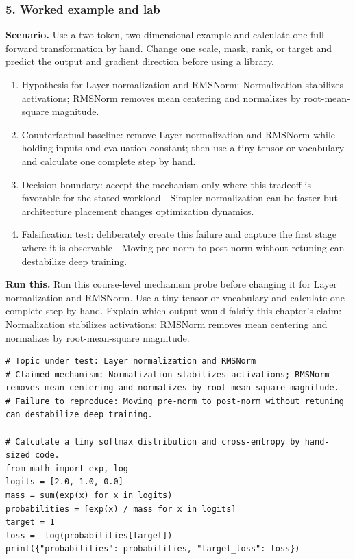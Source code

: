 \subsubsection*{5. Worked example and lab}
\textbf{Scenario.} Use a two-token, two-dimensional example and calculate one full forward transformation by hand. Change one scale, mask, rank, or target and predict the output and gradient direction before using a library.
\begin{enumerate}
\item Hypothesis for Layer normalization and RMSNorm: Normalization stabilizes activations; RMSNorm removes mean centering and normalizes by root-mean-square magnitude.
\item Counterfactual baseline: remove Layer normalization and RMSNorm while holding inputs and evaluation constant; then use a tiny tensor or vocabulary and calculate one complete step by hand.
\item Decision boundary: accept the mechanism only where this tradeoff is favorable for the stated workload—Simpler normalization can be faster but architecture placement changes optimization dynamics.
\item Falsification test: deliberately create this failure and capture the first stage where it is observable—Moving pre-norm to post-norm without retuning can destabilize deep training.
\end{enumerate}
\textbf{Run this.} Run this course-level mechanism probe before changing it for Layer normalization and RMSNorm. Use a tiny tensor or vocabulary and calculate one complete step by hand. Explain which output would falsify this chapter's claim: Normalization stabilizes activations; RMSNorm removes mean centering and normalizes by root-mean-square magnitude.
\begin{Verbatim}[fontsize=\scriptsize]
# Topic under test: Layer normalization and RMSNorm
# Claimed mechanism: Normalization stabilizes activations; RMSNorm removes mean centering and normalizes by root-mean-square magnitude.
# Failure to reproduce: Moving pre-norm to post-norm without retuning can destabilize deep training.

# Calculate a tiny softmax distribution and cross-entropy by hand-sized code.
from math import exp, log
logits = [2.0, 1.0, 0.0]
mass = sum(exp(x) for x in logits)
probabilities = [exp(x) / mass for x in logits]
target = 1
loss = -log(probabilities[target])
print({"probabilities": probabilities, "target_loss": loss})
\end{Verbatim}
